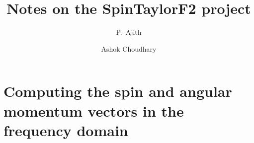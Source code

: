 \documentclass[prd,preprintnumbers,twocolumn,eqsecnum,floatfix,letter]{revtex4}
\begin{document}
\newcommand{\be}{\begin{equation}}
\newcommand{\ee}{\end{equation}}
\newcommand{\ber}{\begin{eqnarray}}
\newcommand{\eer}{\end{eqnarray}}
\def\bea{\begin{eqnarray}}
\def\eea{\end{eqnarray}}
\newcommand{\etal}{\emph{et al.}}

\newcommand{\Sl}{S_\ell}
\newcommand{\Sigmal}{\Sigma_\ell}
\newcommand{\Flux}{\mathcal{F}}
\newcommand{\LNh}{\hat{\mathbf{L}}_N}
\newcommand{\LN}{\mathbf{L}_N}
\newcommand{\bS}{\mathbf{S}}
\newcommand{\bJ}{\mathbf{J}}
\newcommand{\e}{\mathrm{e}}
\newcommand{\rmi}{\mathrm{i}}
\newcommand{\flow}{f_\mathrm{low}}
\newcommand{\fcut}{f_\mathrm{cut}}

\newcommand{\bchi}{\bm{\chi}}
\newcommand{\blambda}{\bm{\lambda}}
\newcommand{\bLambda}{\bm{\Lambda}}
\newcommand{\bchia}{\bm{\chi}_a}
\newcommand{\bchis}{\bm{\chi}_s}
\newcommand{\chis}{\chi_s}
\newcommand{\chia}{\chi_a}
\newcommand{\chiadL}{\bchia \cdot \LNh}
\newcommand{\chisdL}{\bchis \cdot \LNh}
\newcommand{\chisSqr}{\bchis^2}
\newcommand{\chiaSqr}{\bchia^2}
\newcommand{\chisDchia}{\bchis \cdot \bchia}
\newcommand{\cA}{\mathcal{A}}
\newcommand{\cB}{\mathcal{B}}
\newcommand{\cC}{\mathcal{C}}
\newcommand{\cP}{\mathcal{P}}
\newcommand{\pc}{{+,\times}}


\newcommand{\LIGO}{LIGO Laboratory, California Institute of Technology, 
Pasadena, CA 91125, USA}
\newcommand{\CIT}{Theoretical Astrophysics, California Institute of
Technology, Pasadena, CA 91125, USA}
\newcommand{\UWM}{UWM}


\title{Notes on the SpinTaylorF2 project}
\author{P.~Ajith}
\author{Ashok Choudhary}


\begin{abstract}
\end{abstract}

\maketitle

\section{Computing the spin and angular momentum vectors in the frequency domain}
\end{document}
